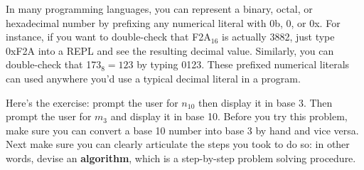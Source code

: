 \documentclass{article}
\begin{document}
In many programming languages, you can represent a binary, octal, or hexadecimal number by prefixing any numerical literal with 0b, 0, or 0x. For instance, if you want to double-check that F2A$_{16}$ is actually 3882, just type 0xF2A into a REPL and see the resulting decimal value. Similarly, you can double-check that 173$_{8} = 123$ by typing 0123. These prefixed numerical literals can used anywhere you'd use a typical decimal literal in a program.

Here's the exercise: prompt the user for $n_{10}$ then display it in base 3. Then prompt the user for $m_{3}$ and display it in base 10. Before you try this problem, make sure you can convert a base 10 number into base 3 by hand and vice versa. Next make sure you can clearly articulate the steps you took to do so: in other words, devise an \textbf{algorithm}, which is a step-by-step problem solving procedure.
\end{document}
